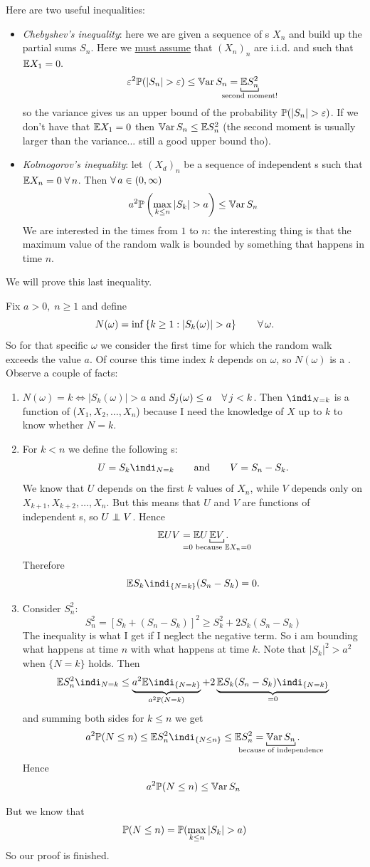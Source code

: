 \documentclass{report}
\begin{document}
Here are two useful inequalities:
\begin{itemize}
	\item \emph{Chebyshev's inequality}: here we are given a sequence of \rv s $X_n$ and build up the partial sums $S_n$. Here we \underline{must assume} that ${(X_n)}_{n}$ are i.i.d. and such that $\mathbb{E} X_1=0.$
	\[\varepsilon^{2}\pr(|S_n|>\varepsilon)\leq\var S_n=\underbracket[0.6pt]{\ev S^{2}_n}_{\mathclap{\text{second moment!}}}\]
	so the variance gives us an upper bound of the probability $\pr(|S_n|>\varepsilon)$. If we don't have that $\mathbb{E} X_1=0$ then $\mathbb{V}\mathrm{ar}\, S_n\leq\mathbb{E} S^{2}_{n}$ (the second moment is usually larger than the variance... still a good upper bound tho).
	\item \emph{Kolmogorov's inequality}: let ${(X_d)}_{n}$ be a sequence of independent \rv s such that $\mathbb{E} X_n=0\;\forall\, n$. Then $\forall\, a\in(0,\infty)$
	\[a^{2}\pr\left(\max_{k\leq n}|S_k|>a\right)\leq\var S_n\]
	We are interested in the times from $1$ to $n$: the interesting thing is that the maximum value of the random walk is bounded by something that happens in time $n$.
\end{itemize}
We will prove this last inequality.
\begin{fancyproof}
	Fix $a>0,\;n\geq 1$ and define
	\[N{(\omega)}=\inf\left\{k\geq1:|S_k(\omega)|>a\right\}\qquad\every\omega.\]
	So for that specific $\omega$ we consider the first time for which the random walk exceeds the value $a$. Of course this time index $k$ depends on $\omega$, so $N(\omega)$ is a \rv. 
	Observe a couple of facts:
	\begin{enumerate}[1)]
		\item $N(\omega)=k\iff|S_k(\omega)|>a$  and $S_j(\omega)\leq a\quad\forall\, j<k$. Then $\indi_{N=k}$ is a function of ($X_1,X_2,\ldots,X_n$) because I need the knowledge of $X$ up to $k$ to know whether $N=k$.
		\item For $k<n$ we define the following \rv s:
		\[U=S_k\indi_{N=k}\qquad\text{and}\qquad V=S_n-S_k.\]
		We know that $U$ depends on the first $k$ values of $X_n$, while $V$ depends only on $X_{k+1},X_{k+2},\ldots,X_{n}$. But this means that $U$ and $V$ are functions of independent \rv s, so $U\independent V$. Hence
		\[\ev UV=\ev U\underbracket[0.6pt]{\ev V}_{\mathclap{=0\text{ because }\ev X_n=0}}.\]
		Therefore
		\[\ev S_k\indi_{\{N=k\}}(S_n-S_k)=0.\]
		\item Consider $S^{2}_{n}$:
		\[S^{2}_{n}=\left[S_k+(S_n-S_{k})\right]^{2}\geq S_{k}^{2}+2S_{k}(S_n-S_k) \]
		The inequality is what I get if I neglect the negative term. So i am bounding what happens at time $n$ with what happens at time $k$. Note that $|S_k|^{2}>a^{2}$ when $\{N=k\}$ holds. Then 
		\[\ev S^{2}_{n}\indi_{N=k}\leq \underbrace{a^{2}\ev\indi_{\{N=k\}}}_{a^{2}\pr(N=k)}+2\underbrace{\ev S_{k}(S_n-S_{k})\indi_{\{N=k\}}}_{=0}\]
		and summing both sides for $k\leq n$ we get
		\[a^{2}\pr(N\leq n)\leq\ev S_n^{2}\indi_{\{N\leq n\}}\leq \ev S_{n}^{2}=\underbracket[0.6pt]{\var S_n}_{\mathclap{\text{because of independence}}}.\]
		Hence
		\[a^{2}\mathbb{P}(N\leq n)\leq\mathbb{V}\mathrm{ar}\, S_n\]
	\end{enumerate} 
	But we know that \[\pr(N\leq n)=\pr(\max_{k\leq n}|S_k|>a)\]
	So our proof is finished.
\end{fancyproof}
\end{document}
